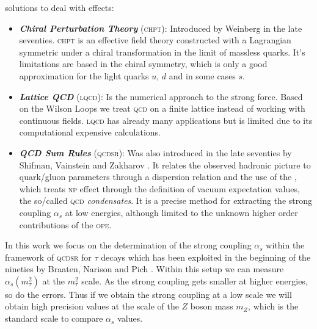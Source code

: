 \documentclass[../../index.tex]{subfiles}
\begin{document}
solutions to deal with  effects:
\begin{itemize}
\item \textbf{\textit{Chiral Perturbation Theory}}
  (\textsc{chpt}):
  Introduced by Weinberg \cite{Weinberg1978} in the late seventies.
  \textsc{chpt} is an effective field theory constructed with a Lagrangian
  symmetric under a chiral transformation in the limit of massless quarks. It's
  limitations are based in the chiral symmetry, which is only a good
  approximation for the light quarks \(u\), \(d\) and in some cases \(s\).
\item \textbf{\textit{Lattice QCD}}
  (\textsc{lqcd}):
  Is the numerical approach to the strong force. Based on the Wilson Loops
  \cite{Wilson1974} we treat \textsc{qcd} on a finite lattice instead of working
  with continuous fields. \textsc{lqcd} has already many applications but is
  limited due to its computational expensive calculations.
\item \textbf{\textit{QCD Sum Rules}}
  (\textsc{qcdsr}): Was also introduced in the late seventies by Shifman, Vainstein and
  Zakharov \cite{Shifman1978,Shifman1978a}. It relates the observed hadronic
  picture to quark\-/gluon parameters through a dispersion relation and the use
  of the , which treats \textsc{np}
  effect through the definition of vacuum expectation values, the so\-/called
  \textsc{qcd} \textit{condensates}. It is a precise method for extracting the
  strong coupling \(\alpha_s\) at low energies, although limited to the unknown
  higher order contributions of the \textsc{ope}.
\end{itemize}


In this work we focus on the determination of the strong coupling \(\alpha_s\)
within the framework of \textsc{qcdsr} for \(\tau\) decays which has been
exploited in the beginning of the nineties by Braaten, Narison and Pich
\cite{Braaten1991}. Within this setup we can measure \(\alpha_s(m_\tau^2)\) at
the \(m_\tau^2\) scale. As the strong coupling gets smaller at higher energies,
so do the errors. Thus if we obtain the strong coupling at a low scale we will
obtain high precision values at the scale of the \(Z\) boson mass \(m_Z\), which
is the standard scale to compare \(\alpha_s\) values.
\end{document}
